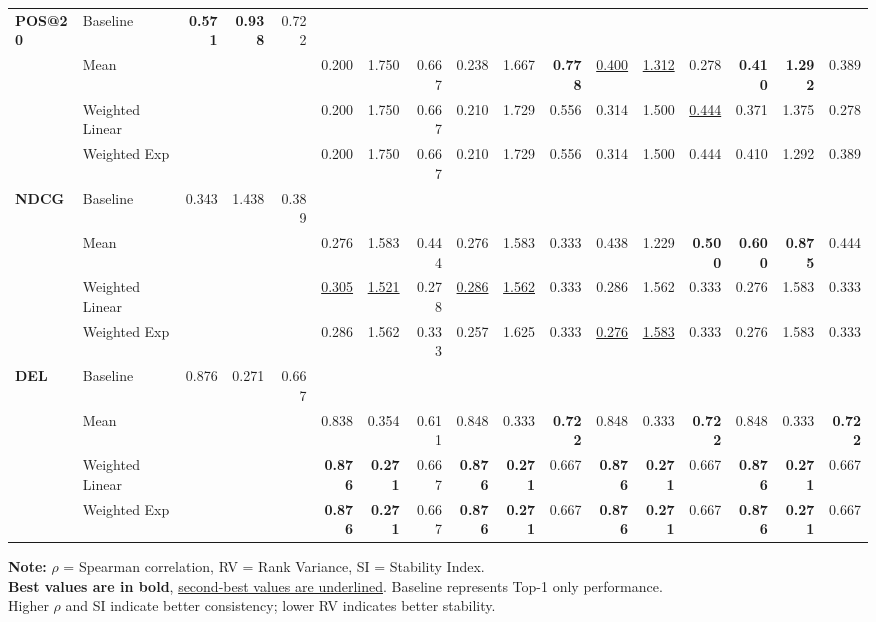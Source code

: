 \documentclass{article}
\begin{document}
\begin{table}[htbp]
\begin{tabular}{@{}llrrr|rrr|rrr|rrr|rrr@{}}
\multirow{4}{*}{\textbf{POS@20}} 
& Baseline & \textbf{0.571} & \textbf{0.938} & 0.722 & & & & & & & & & & & & \\
& Mean & & & & 0.200 & 1.750 & 0.667 & 0.238 & 1.667 & \textbf{0.778} & \uline{0.400} & \uline{1.312} & 0.278 & \textbf{0.410} & \textbf{1.292} & 0.389 \\
& Weighted Linear & & & & 0.200 & 1.750 & 0.667 & 0.210 & 1.729 & 0.556 & 0.314 & 1.500 & \uline{0.444} & 0.371 & 1.375 & 0.278 \\
& Weighted Exp & & & & 0.200 & 1.750 & 0.667 & 0.210 & 1.729 & 0.556 & 0.314 & 1.500 & 0.444 & 0.410 & 1.292 & 0.389 \\
\midrule

\multirow{4}{*}{\textbf{NDCG}} 
& Baseline & 0.343 & 1.438 & 0.389 & & & & & & & & & & & & \\
& Mean & & & & 0.276 & 1.583 & 0.444 & 0.276 & 1.583 & 0.333 & 0.438 & 1.229 & \textbf{0.500} & \textbf{0.600} & \textbf{0.875} & 0.444 \\
& Weighted Linear & & & & \uline{0.305} & \uline{1.521} & 0.278 & \uline{0.286} & \uline{1.562} & 0.333 & 0.286 & 1.562 & 0.333 & 0.276 & 1.583 & 0.333 \\
& Weighted Exp & & & & 0.286 & 1.562 & 0.333 & 0.257 & 1.625 & 0.333 & \uline{0.276} & \uline{1.583} & 0.333 & 0.276 & 1.583 & 0.333 \\
\midrule

\multirow{4}{*}{\textbf{DEL}} 
& Baseline & 0.876 & 0.271 & 0.667 & & & & & & & & & & & & \\
& Mean & & & & 0.838 & 0.354 & 0.611 & 0.848 & 0.333 & \textbf{0.722} & 0.848 & 0.333 & \textbf{0.722} & 0.848 & 0.333 & \textbf{0.722} \\
& Weighted Linear & & & & \textbf{0.876} & \textbf{0.271} & 0.667 & \textbf{0.876} & \textbf{0.271} & 0.667 & \textbf{0.876} & \textbf{0.271} & 0.667 & \textbf{0.876} & \textbf{0.271} & 0.667 \\
& Weighted Exp & & & & \textbf{0.876} & \textbf{0.271} & 0.667 & \textbf{0.876} & \textbf{0.271} & 0.667 & \textbf{0.876} & \textbf{0.271} & 0.667 & \textbf{0.876} & \textbf{0.271} & 0.667 \\

\bottomrule
\end{tabular}
\begin{flushleft}
\textbf{Note:} $\rho$ = Spearman correlation, RV = Rank Variance, SI = Stability Index. \\
\textbf{Best values are in bold}, \uline{second-best values are underlined}. Baseline represents Top-1 only performance. \\
Higher $\rho$ and SI indicate better consistency; lower RV indicates better stability.
\end{flushleft}
\end{table}
\end{document}
